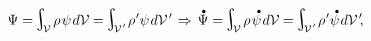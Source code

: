 \nopagebreak\en{\vspace{-0.6em}}\ru{\vspace{-0.3em}}\begin{equation*}
\Psi = \hspace{-0.25ex}\scalebox{1.4}{$\integral$}_{\hspace{-0.5ex}\raisemath{-0.05em}{\mathcal{V}}} \hspace{.3ex} \rho \hspace{.2ex} \psi \hspace{.2ex} d\mathcal{V} \hspace{-0.1ex}
= \hspace{-0.2ex} \scalebox{1.4}{$\integral$}_{\hspace{-0.5ex}\raisemath{-0.05em}{\mathcal{V}\hspace{.12ex}'}} \hspace{.2ex} \rho \hspace{.1ex}' \psi \hspace{.2ex} d\mathcal{V}\hspace{.2ex}'
\hspace{.2ex} \Rightarrow \hspace{.33ex}
\mathdotabove{\Psi} = \hspace{-0.25ex}\scalebox{1.4}{$\integral$}_{\hspace{-0.5ex}\raisemath{-0.05em}{\mathcal{V}}} \hspace{.3ex} \rho \hspace{.2ex} \mathdotabove{\psi} \hspace{.2ex} d\mathcal{V} \hspace{-0.1ex}
= \hspace{-0.2ex} \scalebox{1.4}{$\integral$}_{\hspace{-0.5ex}\raisemath{-0.05em}{\mathcal{V}\hspace{.12ex}'}} \hspace{.2ex} \rho \hspace{.1ex}' \mathdotabove{\psi} \hspace{.2ex} d\mathcal{V}\hspace{.2ex}'\hspace{-0.5ex} ,
\end{equation*}

\vspace{-0.1em}\noindent
{} 

